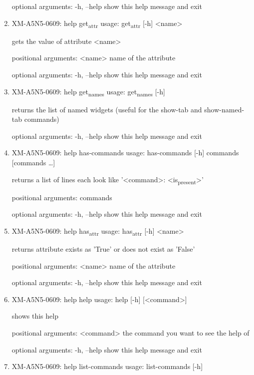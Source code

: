 \documentclass[11pt]{article}
\begin{document}
\begin{enumerate}
optional arguments:
  -h, --help  show this help message and exit

\item XM-A5N5-0609: help get\textsubscript{attr}
\label{sec:org0b80840}
usage: get\textsubscript{attr} [-h] <name>

gets the value of attribute <name>

positional arguments:
  <name>      name of the attribute

optional arguments:
  -h, --help  show this help message and exit

\item XM-A5N5-0609: help get\textsubscript{names}
\label{sec:orgab1601e}
usage: get\textsubscript{names} [-h]

returns the list of named widgets (useful for the show-tab and show-named-tab
commands)

optional arguments:
  -h, --help  show this help message and exit

\item XM-A5N5-0609: help has-commands
\label{sec:org994dc52}
usage: has-commands [-h] commands [commands \ldots{}]

returns a list of lines each look like '<command>: <is\textsubscript{present}>'

positional arguments:
  commands

optional arguments:
  -h, --help  show this help message and exit

\item XM-A5N5-0609: help has\textsubscript{attr}
\label{sec:org341e1f1}
usage: has\textsubscript{attr} [-h] <name>

returns attribute exists as 'True' or does not exist as 'False'

positional arguments:
  <name>      name of the attribute

optional arguments:
  -h, --help  show this help message and exit

\item XM-A5N5-0609: help help
\label{sec:orgb20940d}
usage: help [-h] [<command>]

shows this help

positional arguments:
  <command>   the command you want to see the help of

optional arguments:
  -h, --help  show this help message and exit

\item XM-A5N5-0609: help list-commands
\label{sec:orgd863c87}
usage: list-commands [-h]


\end{enumerate}
\end{document}
